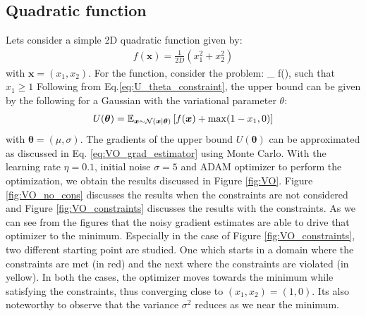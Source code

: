 \subsection{Quadratic function}
Lets consider a simple 2D quadratic function given by:
\begin{align}
	f(\bm{x}) = \frac{1}{2D}\left( x_1^2 + x_2^2\right)
\end{align}
with $\bm{x} = (x_1,x_2)$. For the function, consider the problem:
\be
\min_{} f(), \qquad \textrm{ such that $x_1 \geq 1$ }
\ee
%
Following from Eq.\ref{eq:U_theta_constraint}, the upper bound can be given by the following for a Gaussian with the variational parameter $\theta$:
\begin{align}
	U(\bm{\theta}) = \mathbb{E}_{\bm{x}\sim \mathcal{N}(\bm{x}\mid \bm{\theta})}\left[ f(\bm{x}) + \max (1-x_1,0)\right]
\end{align}
with $\bm{\theta} = (\mu,\sigma)$. The gradients of the upper bound $U(\bm{\theta})$ can be approximated as discussed in Eq. \ref{eq:VO_grad_estimator} using Monte Carlo. With the learning rate $\eta=0.1$, initial noise $\sigma = 5$ and ADAM optimizer to perform the optimization, we obtain the results discussed in Figure \ref{fig:VO}. Figure \ref{fig:VO_no_cons} discusses the results when the constraints are not considered and Figure \ref{fig:VO_constraints} discusses the results with the constraints. As we can see from the figures that the noisy gradient estimates are able to drive that optimizer to the minimum. Especially in the case of Figure \ref{fig:VO_constraints}, two different starting point are studied. One which starts in a domain where the constraints are met (in red) and the next where the constraints are violated (in yellow). In both the cases, the optimizer moves towards the minimum while satisfying the constraints, thus converging close to $(x_1,x_2)= (1,0)$. Its also noteworthy to observe that the variance $\sigma^2$ reduces as we near the minimum.  

